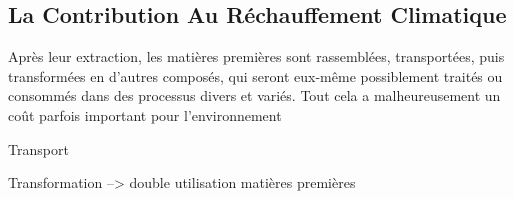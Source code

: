 \subsection{La Contribution Au Réchauffement Climatique}


Après leur extraction, les matières premières sont rassemblées, transportées, puis transformées en d'autres composés, qui seront eux-même possiblement traités ou consommés dans des processus divers et variés. Tout cela a malheureusement un coût parfois important pour l'environnement

\medbreak 



Transport


Transformation
--> double utilisation matières premières